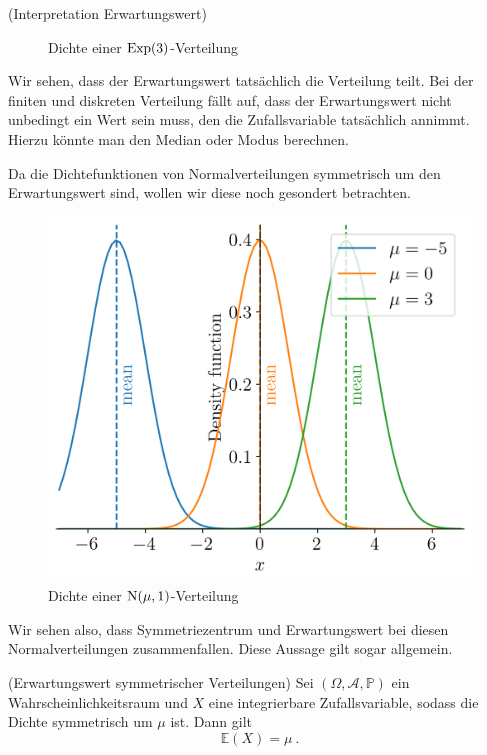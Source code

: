 \begin{Beispiel}{(Interpretation Erwartungswert)}
\begin{minipage}{0.5\linewidth}
\begin{figure}[H]
\begin{center}
\caption{\centering Dichte einer $\operatorname{Exp}(3)$-Verteilung}
\end{center}
\end{figure}
\end{minipage}

Wir sehen, dass der Erwartungswert tatsächlich die Verteilung teilt. Bei der finiten und diskreten Verteilung fällt auf, dass der Erwartungswert nicht unbedingt ein Wert sein muss, den die Zufallsvariable tatsächlich annimmt. Hierzu könnte man den Median  oder Modus  berechnen.

\newpage 

Da die Dichtefunktionen von Normalverteilungen symmetrisch um den Erwartungswert sind, wollen wir diese noch gesondert betrachten.

\begin{figure}[H]
\centering
\includegraphics[width=0.5\linewidth]{./Section/Momente/Erwartungswert Normal Multi.png}
\caption{Dichte einer $\operatorname{N}(\mu, 1)$-Verteilung}
\end{figure}

Wir sehen also, dass Symmetriezentrum und Erwartungswert bei diesen Normalverteilungen zusammenfallen. Diese Aussage gilt sogar allgemein.
\end{Beispiel}

\vspace*{-\medskipamount}

\begin{Satz}{(Erwartungswert symmetrischer Verteilungen)}
Sei $(\Omega, \mathscr{A}, \mathbb{P})$ ein Wahrscheinlichkeitsraum und $X$ eine integrierbare Zufallsvariable, sodass die Dichte symmetrisch um $\mu$ ist. Dann gilt
\[\mathbb{E}(X) = \mu~.\]
\end{Satz}

